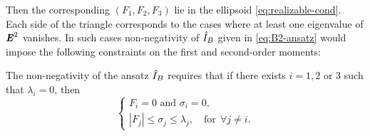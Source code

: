 Then the corresponding $(F_1,F_2,F_3)$ lie in the ellipsoid 
\eqref{eq:realizable-cond}. 
Each side of the triangle corresponds to the cases where at least 
one eigenvalue of $\boldsymbol{\mathit{E}}^2$ vanishes. In such cases non-negativity of
$\hat I_B$ given in \eqref{eq:B2-ansatz} would impose the following
constraints on the first and second-order moments:
\begin{lemma}\label{lem:lambda2sigma}
  The non-negativity of the ansatz $\hat I_B$ requires
  that if there exists $i = 1,2$ or $3$ such that $\lambda_i = 0$, then
  \[
  \left\{
    \begin{array}{l}
      F_i=0 \text{ and } \sigma_i = 0, \\
      |F_j| \leq \sigma_j \leq \lambda_j,
      \quad \text{for}~~\forall j \not= i.
    \end{array}\right.
  \]
  \end{lemma}
